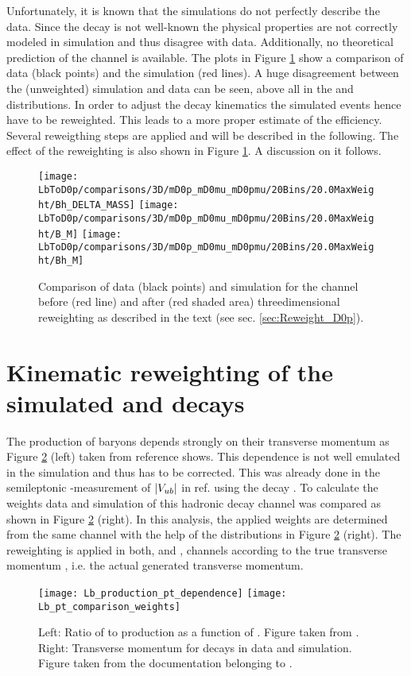 Unfortunately, it is known that the simulations do not perfectly describe the data. 
Since the decay \LbToDpmunuX is not well-known the physical properties are not correctly modeled in simulation and thus disagree with data.
Additionally, no theoretical prediction of the \LbToDpmunuX channel is available.
The plots in Figure \ref{fig:reweighting} show a comparison of data (black points) and the simulation (red lines).
A huge disagreement between the (unweighted) simulation and data can be seen, above all in the \MDp and \MDmu distributions.
In order to adjust the decay kinematics the simulated events hence have to be reweighted.
This leads to a more proper estimate of the efficiency.
Several reweigthing steps are applied and will be described in the following.
The effect of the reweighting is also shown in Figure \ref{fig:reweighting}.
A discussion on it follows.
\begin{figure}[tb]
	\centering
	\texttt{[image: LbToD0p/comparisons/3D/mD0p\_mD0mu\_mD0pmu/20Bins/20.0MaxWeight/Bh\_DELTA\_MASS]}
	\texttt{[image: LbToD0p/comparisons/3D/mD0p\_mD0mu\_mD0pmu/20Bins/20.0MaxWeight/B\_M]}
	\texttt{[image: LbToD0p/comparisons/3D/mD0p\_mD0mu\_mD0pmu/20Bins/20.0MaxWeight/Bh\_M]}
	\caption{Comparison of data (black points) and simulation for the \LbToDpmunuX channel before (red line) and after (red shaded area) threedimensional reweighting as described in the text (see sec. \ref{sec:Reweight_D0p}).}
	\label{fig:reweighting}
\end{figure}

\section{Kinematic reweighting of the simulated \LbToDpmunuX and \LbToLcmunu decays}
The production of \Lb baryons depends strongly on their transverse momentum as Figure \ref{fig:LbPTrew} (left) taken from reference \cite{Lb_production_kinematic} shows. 
This dependence is not well emulated in the simulation and thus has to be corrected. 
This was already done in the semileptonic \lhcb-measurement of $|{V_{{u}{b}}}|$ in ref. \cite{SL_Vub} using the decay \decay{\Lb}{\jpsi\Dz\proton}. 
To calculate the weights data and simulation of this hadronic \Lb decay channel was compared as shown in Figure \ref{fig:LbPTrew} (right). 
In this analysis, the applied weights are determined from the same channel with the help of the distributions in Figure \ref{fig:LbPTrew} (right).
The reweighting is applied in both, \LbToDpmunuX and \LbToLcmunu, channels according to the true \Lb transverse momentum \pt, i.e. the actual generated transverse momentum.
\begin{figure}[tb]
	\centering
	\texttt{[image: Lb\_production\_pt\_dependence]}
	\texttt{[image: Lb\_pt\_comparison\_weights]}
	\caption{Left: Ratio of \Lb to \Bd production as a function of \pt. Figure taken from \cite{Lb_production_kinematic}.  Right: Transverse \Lb momentum for \decay{\Lb}{\jpsi\Dz\proton} decays in data and simulation. Figure taken from the documentation belonging to \cite{SL_Vub}.}
	\label{fig:LbPTrew}
\end{figure}

